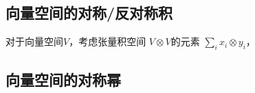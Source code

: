 

\subsection{向量空间的对称/反对称积}

对于向量空间$V$，考虑张量积空间 $V \otimes V$的元素 $\sum_i x_i \otimes y_i$，


\subsection{向量空间的对称幂}